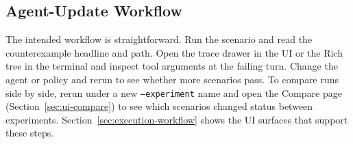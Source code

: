 \subsection{Agent-Update Workflow}

The intended workflow is straightforward. Run the scenario and read the counterexample headline and path. Open the trace drawer in the UI or the Rich tree in the terminal and inspect tool arguments at the failing turn. Change the agent or policy and rerun to see whether more scenarios pass. To compare runs side by side, rerun under a new \texttt{--experiment} name and open the Compare page (Section~\ref{sec:ui-compare}) to see which scenarios changed status between experiments. Section~\ref{sec:execution-workflow} shows the UI surfaces that support these steps.
